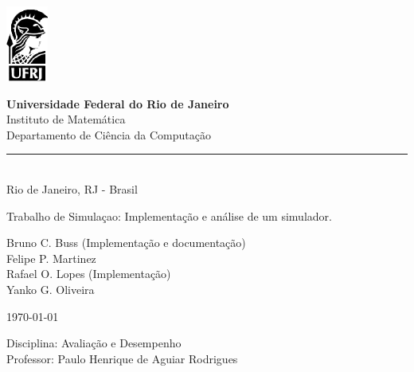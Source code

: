 \documentclass[a4paper,10pt]{article}
\begin{document}
\begin{titlepage}

\begin{minipage}{0.2\linewidth}
 \includegraphics[]{./minerva.png}
\end{minipage}
\begin{minipage}{0.8\linewidth}
 \textbf{Universidade Federal do Rio de Janeiro}\\
 Instituto de Matemática\\
 Departamento de Ciência da Computação\\
 \rule{0.8\linewidth}{0.5mm}\\
 Rio de Janeiro, RJ - Brasil
\end{minipage}

\begin{center}

\vspace{2cm}

\Large
Trabalho de Simulaçao: Implementação e análise de um simulador.

\vspace{1cm}

\large

Bruno C. Buss (Implementação e documentação)\\
Felipe P. Martinez\\
Rafael O. Lopes (Implementação)\\
Yanko G. Oliveira\\

\vspace{1cm}

\today

\normalsize
\end{center}

\vfill

\begin{flushright}
Disciplina: Avaliação e Desempenho\\
Professor: Paulo Henrique de Aguiar Rodrigues\\
\end{flushright}

\vspace{4cm}

\end{titlepage}
\end{document}
